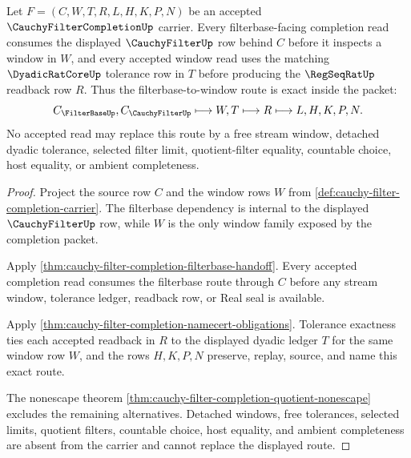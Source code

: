 \begin{theorem}
\label{thm:cauchy-filter-completion-filterbase-window-exactness}
Let $F=(C,W,T,R,L,H,K,P,N)$ be an accepted $\CauchyFilterCompletionUp$ carrier. Every filterbase-facing completion read consumes the displayed $\CauchyFilterUp$ row behind $C$ before it inspects a window in $W$, and every accepted window read uses the matching $\DyadicRatCoreUp$ tolerance row in $T$ before producing the $\RegSeqRatUp$ readback row $R$. Thus the filterbase-to-window route is exact inside the packet:
$$
C_{\FilterBaseUp},C_{\CauchyFilterUp} \longmapsto W,T \longmapsto R \longmapsto L,H,K,P,N .
$$
No accepted read may replace this route by a free stream window, detached dyadic tolerance, selected filter limit, quotient-filter equality, countable choice, host equality, or ambient completeness.
\end{theorem}
\begin{proof}
Project the source row $C$ and the window rows $W$ from \autoref{def:cauchy-filter-completion-carrier}. The filterbase dependency is internal to the displayed $\CauchyFilterUp$ row, while $W$ is the only window family exposed by the completion packet.

Apply \autoref{thm:cauchy-filter-completion-filterbase-handoff}. Every accepted completion read consumes the filterbase route through $C$ before any stream window, tolerance ledger, readback row, or Real seal is available.

Apply \autoref{thm:cauchy-filter-completion-namecert-obligations}. Tolerance exactness ties each accepted readback in $R$ to the displayed dyadic ledger $T$ for the same window row $W$, and the rows $H,K,P,N$ preserve, replay, source, and name this exact route.

The nonescape theorem \autoref{thm:cauchy-filter-completion-quotient-nonescape} excludes the remaining alternatives. Detached windows, free tolerances, selected limits, quotient filters, countable choice, host equality, and ambient completeness are absent from the carrier and cannot replace the displayed route.
\end{proof}

